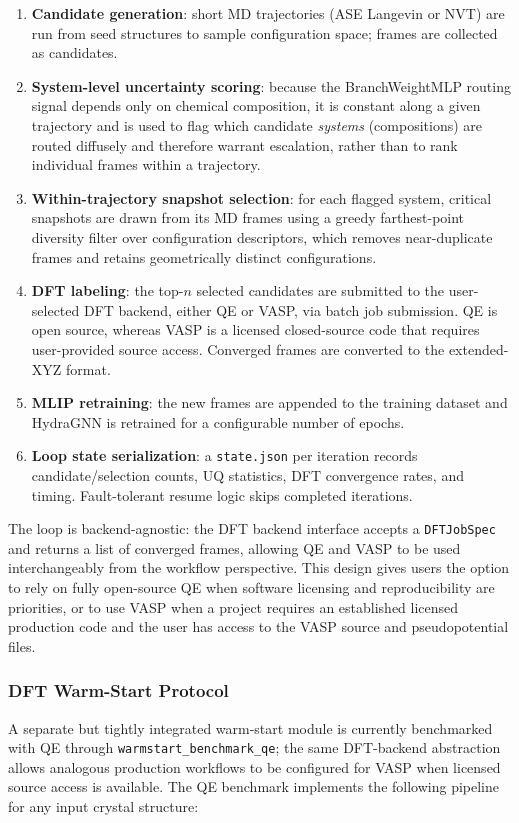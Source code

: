 \documentclass[conference]{IEEEtran}
\def\ac#1{#1}%
\def\acs#1{#1}%
\begin{document}
\begin{enumerate}
\item \textbf{Candidate generation}: short \ac{MD} trajectories (\acs{ASE} Langevin or
  \ac{NVT}) are run from seed structures to sample configuration space; frames are
  collected as candidates.
\item \textbf{System-level uncertainty scoring}: because the BranchWeightMLP
  routing signal depends only on chemical composition, it is constant along a
  given trajectory and is used to flag which candidate \emph{systems}
  (compositions) are routed diffusely and therefore warrant escalation, rather
  than to rank individual frames within a trajectory.
\item \textbf{Within-trajectory snapshot selection}: for each flagged system,
  critical snapshots are drawn from its \ac{MD} frames using a greedy
  farthest-point diversity filter over configuration descriptors, which removes
  near-duplicate frames and retains geometrically distinct configurations.
\item \textbf{\acs{DFT} labeling}: the top-$n$ selected candidates are submitted to
  the user-selected \acs{DFT} backend, either \acs{QE} or \acs{VASP}, via
  batch job submission. \acs{QE} is open source, whereas \acs{VASP} is a licensed
  closed-source code that requires user-provided source access. Converged frames
  are converted to the extended-XYZ format.
\item \textbf{\acs{MLIP} retraining}: the new frames are appended to the training
  dataset and HydraGNN is retrained for a configurable number of epochs.
\item \textbf{Loop state serialization}: a \texttt{state.json} per iteration
  records candidate/selection counts, \acs{UQ} statistics, \acs{DFT} convergence rates,
  and timing. Fault-tolerant resume logic skips completed iterations.
\end{enumerate}

The loop is backend-agnostic: the \acs{DFT} backend interface accepts a
\texttt{DFTJobSpec} and returns a list of converged frames, allowing \acs{QE} and
\acs{VASP} to be used interchangeably from the workflow perspective. This design gives
users the option to rely on fully open-source \acs{QE} when software licensing and
reproducibility are priorities, or to use \acs{VASP} when a project requires an
established licensed production code and the user has access to the \acs{VASP} source
and pseudopotential files.

\subsubsection{DFT Warm-Start Protocol}
A separate but tightly integrated warm-start module is currently benchmarked
with \acs{QE} through \texttt{warmstart\_benchmark\_qe}; the same \acs{DFT}-backend
abstraction allows analogous production workflows to be configured for \acs{VASP}
when licensed source access is available. The \acs{QE} benchmark implements the
following pipeline for any input crystal structure:
\end{document}
